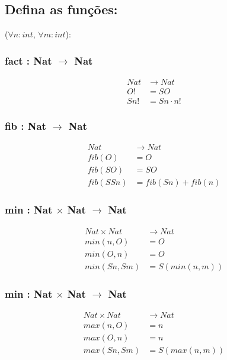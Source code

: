 \documentclass[a4paper, 12pt]{article}
\begin{document}
\subsection*{Defina as funções:}
%
($\forall n:int$, $\forall m:int$):
%
\subsubsection*{fact : Nat $\to$ Nat}
%
\begin{align*}
    Nat &\to Nat\\
    O! &= SO\\
    Sn! &= Sn \cdot n!
\end{align*}
%
\subsubsection*{fib  : Nat $\to$ Nat}
%
\begin{align*}
    Nat &\to Nat\\
    fib(O) &= O\\
    fib(SO) &= SO\\
    fib(SSn) &= fib(Sn) + fib(n)
\end{align*}
%
\subsubsection*{min  : Nat $\times$ Nat $\to$ Nat}
%
\begin{align*}
    Nat \times Nat &\to Nat\\
    min(n, O) &= O\\
    min(O, n) &= O\\
    min(Sn, Sm) &= S(min(n, m))
\end{align*}
%
\subsubsection*{min  : Nat $\times$ Nat $\to$ Nat}
%
\begin{align*}
    Nat \times Nat &\to Nat\\
    max(n, O) &= n\\
    max(O, n) &= n\\
    max(Sn, Sm) &= S(max(n, m))
\end{align*}
%
\end{document}
